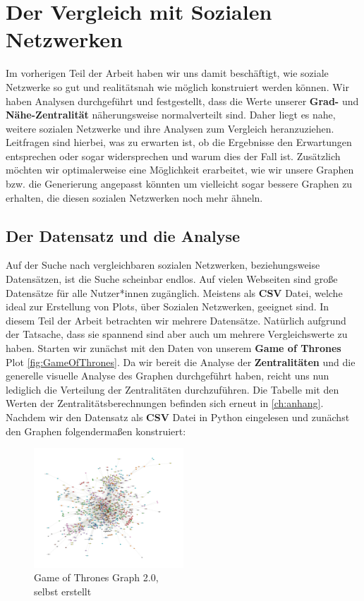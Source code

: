 \chapter{Der Vergleich mit Sozialen Netzwerken}\label{ch:vergleich}

Im vorherigen Teil der Arbeit haben wir uns damit beschäftigt, wie soziale Netzwerke so gut und realitätsnah wie möglich konstruiert werden können. Wir haben Analysen durchgeführt und festgestellt, dass die Werte unserer \textbf{Grad-} und \textbf{Nähe-Zentralität} näherungsweise normalverteilt sind. Daher liegt es nahe, weitere sozialen Netzwerke und ihre Analysen zum Vergleich heranzuziehen. Leitfragen sind hierbei, was zu erwarten ist, ob die Ergebnisse den Erwartungen entsprechen oder sogar widersprechen und warum dies der Fall ist. Zusätzlich möchten wir optimalerweise eine Möglichkeit erarbeitet, wie wir unsere Graphen bzw. die Generierung angepasst könnten um vielleicht sogar bessere Graphen zu erhalten, die diesen sozialen Netzwerken noch mehr ähneln. 

\section{Der Datensatz und die Analyse}
Auf der Suche nach vergleichbaren sozialen Netzwerken, beziehungsweise Datensätzen, ist die Suche scheinbar endlos. Auf vielen Webseiten sind große Datensätze für alle Nutzer*innen zugänglich. Meistens als \textbf{CSV} Datei, welche ideal zur Erstellung von Plots, über Sozialen Netzwerken, geeignet sind. In diesem Teil der Arbeit betrachten wir mehrere Datensätze. Natürlich aufgrund der Tatsache, dass sie spannend sind aber auch um mehrere Vergleichswerte zu haben. Starten wir zunächst mit den Daten \cite{GOT} von unserem \textbf{Game of Thrones} Plot \ref{fig:GameOfThrones}. Da wir bereit die Analyse der \textbf{Zentralitäten} und die generelle visuelle Analyse des Graphen durchgeführt haben, reicht uns nun lediglich die Verteilung der Zentralitäten durchzuführen. Die Tabelle mit den Werten der Zentralitätsberechnungen befinden sich erneut in \ref{ch:anhang}. Nachdem wir den Datensatz als \textbf{CSV} Datei in Python eingelesen und zunächst den Graphen folgendermaßen konstruiert:

\FloatBarrier
\begin{figure}[h!]%
  \centering
  \includegraphics[width=0.5\textwidth]{Graphics/GOTGraph_unweighted.png}
  \caption{Game of Thrones Graph 2.0, \\
  selbst erstellt}
  \label{fig:GOT2.0}
\end{figure}
\FloatBarrier

